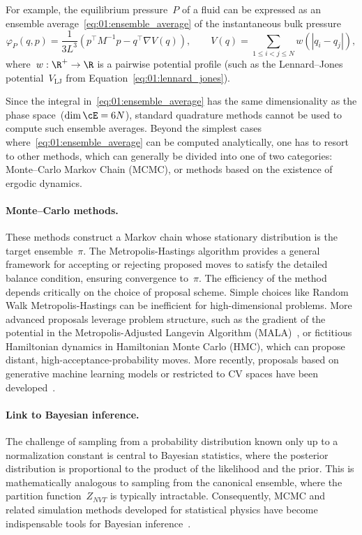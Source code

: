 For example, the equilibrium pressure~$P$ of a fluid can be expressed as an ensemble average~\eqref{eq:01:ensemble_average} of the instantaneous bulk pressure
\begin{equation}
    \label{eq:01:pressure}
    \varphi_P(q,p) = \frac{1}{3L^3}\left(p^\top M^{-1}p-q^\top\nabla V(q)\right),\qquad V(q) = \sum_{1\leq i<j\leq N} w(|q_i-q_j|),
\end{equation}
where~$w:\R^+\to\R$ is a pairwise potential profile (such as the Lennard--Jones potential~$V_{\mathrm{LJ}}$ from Equation~\eqref{eq:01:lennard_jones}).

Since the integral in~\eqref{eq:01:ensemble_average} has the same dimensionality as the phase space~(${\dim \cE=6N}$), standard quadrature methods cannot be used to compute such ensemble averages.
Beyond the simplest cases where~\eqref{eq:01:ensemble_average} can be computed analytically, one has to resort to other methods, which can generally be divided into one of two categories: Monte--Carlo Markov Chain (MCMC), or methods based on the existence of ergodic dynamics.

\paragraph{Monte--Carlo methods.} These methods construct a Markov chain whose stationary distribution is the target ensemble~$\pi$. The Metropolis-Hastings algorithm provides a general framework for accepting or rejecting proposed moves to satisfy the detailed balance condition, ensuring convergence to~$\pi$. The efficiency of the method depends critically on the choice of proposal scheme. Simple choices like Random Walk Metropolis-Hastings can be inefficient for high-dimensional problems. More advanced proposals leverage problem structure, such as the gradient of the potential in the Metropolis-Adjusted Langevin Algorithm (MALA)~\cite{BLS25a}, or fictitious Hamiltonian dynamics in Hamiltonian Monte Carlo (HMC), which can propose distant, high-acceptance-probability moves.
More recently, proposals based on generative machine learning models or restricted to CV spaces have been developed~\cite{BLS25a}.

\paragraph{Link to Bayesian inference.} The challenge of sampling from a probability distribution known only up to a normalization constant is central to Bayesian statistics, where the posterior distribution is proportional to the product of the likelihood and the prior. This is mathematically analogous to sampling from the canonical ensemble, where the partition function~$Z_{NVT}$ is typically intractable. Consequently, MCMC and related simulation methods developed for statistical physics have become indispensable tools for Bayesian inference~\cite{BLS25a}.

